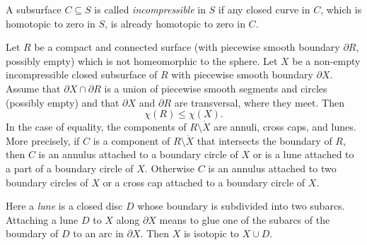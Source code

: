 A subsurface $C\subseteq S$ is called \emph{incompressible} in $S$
if any closed curve in $C$, which is homotopic to zero in $S$,
is already homotopic to zero in $C$.

\begin{lem}\label{sub}
Let $R$ be a compact and connected surface
(with piecewise smooth boundary $\partial R$, possibly empty)
which is not homeomorphic to the sphere.
Let $X$ be a non-empty incompressible closed subsurface of $R$
with piecewise smooth boundary $\partial X$.
Assume that $\partial X\cap\partial R$ is a union
of piecewise smooth segments and circles (possibly empty)
and that $\partial X$ and $\partial R$ are transversal, where they meet.
Then \[\chi(R)\le\chi(X).\]
In the case of equality,
the components of $R\setminus\mathring X$ are annuli, cross caps, and lunes.
More precisely, if $C$ is a component of $R\setminus\mathring X$ that intersects
the boundary of $R$,
then $C$ is an annulus attached to a boundary circle of $X$
or is a lune attached to a part of a boundary circle of $X$.
Otherwise $C$ is an annulus attached to two boundary circles of $X$
or a cross cap attached to a boundary circle of $X$.
\end{lem}

Here a \emph{lune} is a closed disc $D$ whose boundary is subdivided into two subarcs.
Attaching a lune $D$ to $X$ along $\partial X$ means to glue one of the
subarcs of the boundary of $D$ to an arc in $\partial X$.
Then $X$ is isotopic to $X\cup D$.

